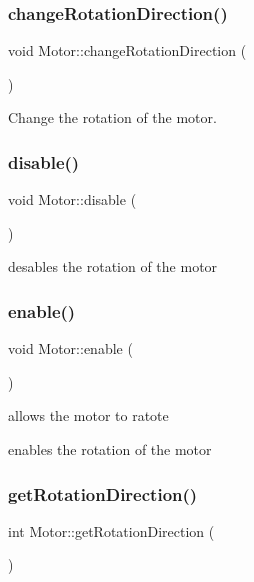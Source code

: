 \subsubsection{\texorpdfstring{change\+Rotation\+Direction()}{changeRotationDirection()}}
{\footnotesize\ttfamily void Motor\+::change\+Rotation\+Direction (\begin{DoxyParamCaption}{ }\end{DoxyParamCaption})}



Change the rotation of the motor. 

\mbox{\label{class_motor_adf84e8f39fb82027b3343f5fb1cdbf96}} 
\subsubsection{\texorpdfstring{disable()}{disable()}}
{\footnotesize\ttfamily void Motor\+::disable (\begin{DoxyParamCaption}{ }\end{DoxyParamCaption})}



desables the rotation of the motor 

\mbox{\label{class_motor_acdf6ea64d3bc32cec89103ea23521303}} 
\subsubsection{\texorpdfstring{enable()}{enable()}}
{\footnotesize\ttfamily void Motor\+::enable (\begin{DoxyParamCaption}{ }\end{DoxyParamCaption})}



allows the motor to ratote 

enables the rotation of the motor \mbox{\label{class_motor_a45a803953ffadfb187cbbad35702da69}} 
\subsubsection{\texorpdfstring{get\+Rotation\+Direction()}{getRotationDirection()}}
{\footnotesize\ttfamily int Motor\+::get\+Rotation\+Direction (\begin{DoxyParamCaption}{ }\end{DoxyParamCaption})}



